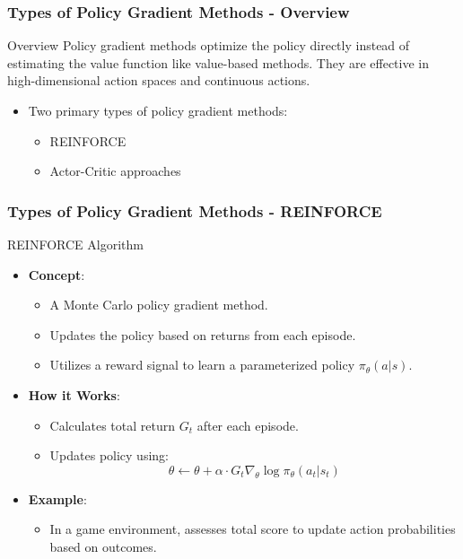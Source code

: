 \documentclass{beamer}
\begin{document}
\begin{frame}[fragile]
    \frametitle{Types of Policy Gradient Methods - Overview}
    \begin{block}{Overview}
        Policy gradient methods optimize the policy directly instead of estimating the value function like value-based methods. They are effective in high-dimensional action spaces and continuous actions.
    \end{block}
    \begin{itemize}
        \item Two primary types of policy gradient methods:
        \begin{itemize}
            \item REINFORCE
            \item Actor-Critic approaches
        \end{itemize}
    \end{itemize}
\end{frame}

\begin{frame}[fragile]
    \frametitle{Types of Policy Gradient Methods - REINFORCE}
    \begin{block}{REINFORCE Algorithm}
        \begin{itemize}
            \item \textbf{Concept}:
            \begin{itemize}
                \item A Monte Carlo policy gradient method.
                \item Updates the policy based on returns from each episode.
                \item Utilizes a reward signal to learn a parameterized policy \( \pi_{\theta}(a|s) \).
            \end{itemize}
            \item \textbf{How it Works}:
            \begin{itemize}
                \item Calculates total return \( G_t \) after each episode.
                \item Updates policy using:
                \begin{equation}
                \theta \leftarrow \theta + \alpha \cdot G_t \nabla_\theta \log \pi_{\theta}(a_t|s_t)
                \end{equation}
            \end{itemize}
            \item \textbf{Example}:
            \begin{itemize}
                \item In a game environment, assesses total score to update action probabilities based on outcomes.
            \end{itemize}
        \end{itemize}
    \end{block}
\end{frame}
\end{document}
